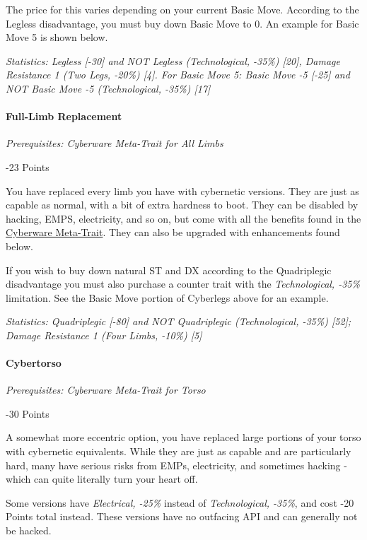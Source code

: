 \begin{multicols*}{3}
	The price for this varies depending on your current Basic Move. According to the Legless disadvantage, you must buy down Basic Move to 0. An example for Basic Move 5 is shown below.
	
	\textit{\textcolor{OliveGreen}{Statistics:  Legless [-30] and NOT Legless (Technological, -35\%) [20], Damage Resistance 1 (Two Legs, -20\%) [4]. For Basic Move 5: Basic Move -5 [-25] and NOT Basic Move -5 (Technological, -35\%) [17]}}
	
	\paragraph{Full-Limb Replacement}
	\textit{Prerequisites:  Cyberware Meta-Trait for All Limbs}
	\begin{flushright}
		-23 Points
	\end{flushright}
	
	You have replaced every limb you have with cybernetic versions. They are just as capable as normal, with a bit of extra hardness to boot. They can be disabled by hacking, EMPS, electricity, and so on, but come with all the benefits found in the \hyperref[cyberware-meta-trait]{Cyberware Meta-Trait}. They can also be upgraded with enhancements found below.
	
	If you wish to buy down natural ST and DX according to the Quadriplegic disadvantage you must also purchase a counter trait with the \textit{Technological, -35\%} limitation. See the Basic Move portion of Cyberlegs above for an example.
	
	\textit{\textcolor{OliveGreen}{Statistics: Quadriplegic [-80] and NOT Quadriplegic (Technological, -35\%) [52]; Damage Resistance 1 (Four Limbs, -10\%) [5]}}
	
	\paragraph{Cybertorso}
	\textit{Prerequisites:  Cyberware Meta-Trait for Torso}
	\begin{flushright}
		-30 Points
	\end{flushright}

	A somewhat more eccentric option, you have replaced large portions of your torso with cybernetic equivalents. While they are just as capable and are particularly hard, many have serious risks from EMPs, electricity, and sometimes hacking - which can quite literally turn your heart off.
	
	Some versions have \textit{Electrical, -25\%} instead of \textit{Technological, -35\%}, and cost -20 Points total instead. These versions have no outfacing API and can generally not be hacked.
	

\end{multicols*}
